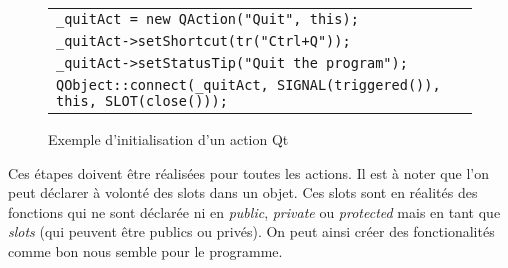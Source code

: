 \begin{figure}[H]
   \begin{center}
      \begin{tabular}{l}
         \hline
         \verb|_quitAct = new QAction("Quit", this);|\\
         \verb|_quitAct->setShortcut(tr("Ctrl+Q"));|\\
         \verb|_quitAct->setStatusTip("Quit the program");|\\
         \verb|QObject::connect(_quitAct, SIGNAL(triggered()), this, SLOT(close()));|\\
         \hline
      \end{tabular}
   \end{center}
\caption{\label{exemple_initAction_qt} Exemple d'initialisation d'un action Qt}
\end{figure}

Ces \'etapes doivent \^etre r\'ealis\'ees pour toutes les actions. Il est \`a noter que l'on peut d\'eclarer \`a volont\'e des slots dans un objet. Ces slots sont en r\'ealit\'es des fonctions qui ne sont d\'eclar\'ee ni en \textit{public}, \textit{private} ou \textit{protected} mais en tant que \textit{slots} (qui peuvent \^etre publics ou priv\'es). On peut ainsi cr\'eer des fonctionalit\'es comme bon nous semble pour le programme.